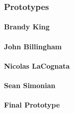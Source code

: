\subsubsection{Prototypes}

\paragraph{Brandy King}


\paragraph{John Billingham}


\paragraph{Nicolas LaCognata}


\paragraph{Sean Simonian}


\paragraph{Final Prototype}
